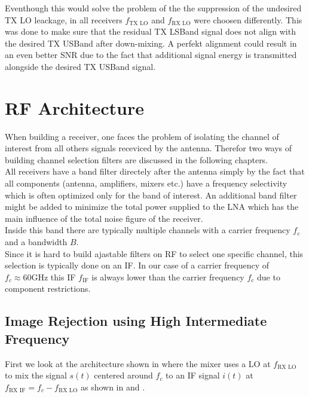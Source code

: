Eventhough this would solve the problem of the the suppression of the
undesired \gls{TX} \gls{LO} leackage, in all receivers
$f_{\text{TX LO}}$ and $f_{\text{RX LO}}$ were choosen differently.
This was done to make sure that the residual \gls{TX} \gls{LSBand}
signal does not align with the desired \gls{TX} \gls{USBand} after
down-mixing. A perfekt alignment could result in an even better
\gls{SNR} due to the fact that additional signal energy is transmitted
alongside the desired \gls{TX} \gls{USBand} signal. \\

\section{RF Architecture}
When building a receiver, one faces the problem of isolating the channel of
interest from all others signals receviced by the antenna. Therefor
two ways of building channel selection filters are discussed in the following
chapters. \\

All receivers have a band filter directely after the antenna simply by the
fact that all components (antenna, amplifiers, mixers etc.) have a frequency
selectivity which is often optimized only for the band of interest.
An additional band filter might be added to minimize the total power supplied
to the \gls{LNA} which has the main influence of the total noise figure of
the receiver. \\

Inside this band there are typically multiple channels with a carrier frequency
$f_c$ and a bandwidth $B$. \\

Since it is hard to build ajastable filters on \gls{RF} to select one specific
channel, this selection is typically done on an \gls{IF}. In our case of a
carrier frequency of $f_c \approx 60 \text{GHz}$ this \gls{IF} $f_{\text{IF}}$
is always lower than the carrier frequency $f_c$ due to component restrictions. \\

\subsection{Image Rejection using High Intermediate Frequency}
\label{sec:rx_rf_0}
First we look at the architecture shown in  where
the mixer uses a \gls{LO} at $f_{\text{RX LO}}$ to mix the signal $s(t)$
centered around $f_{c}$ to an \gls{IF} signal $i(t)$ at
$f_{\text{RX IF}} = f_{c} - f_{\text{RX LO}}$ as shown in 
and . \\

